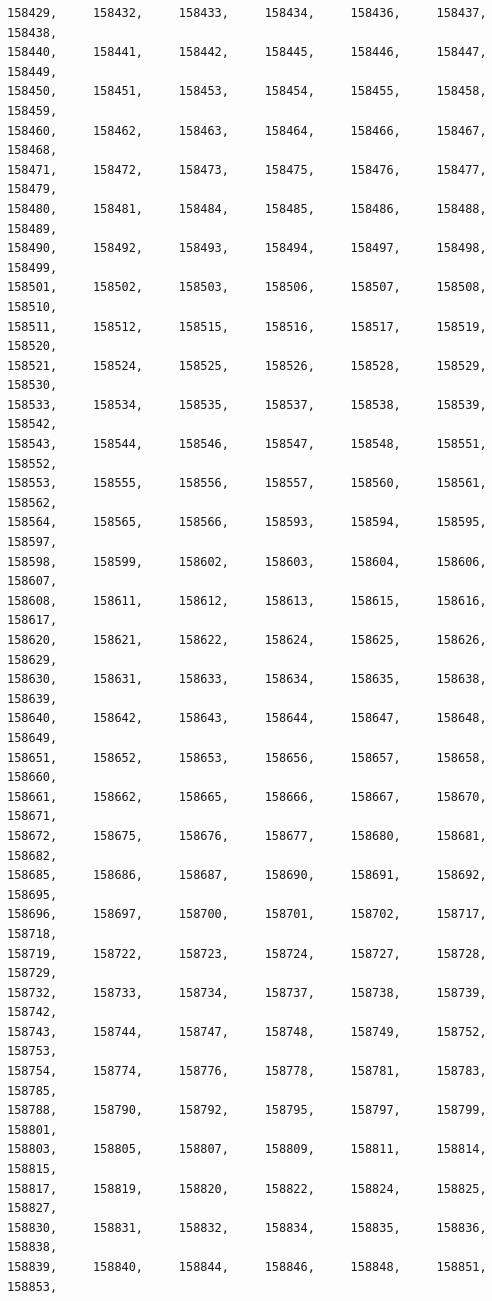 \documentclass[a4paper,11pt]{report}
\begin{document}
\begin{verbatim}
158429,     158432,     158433,     158434,     158436,     158437,     158438,
158440,     158441,     158442,     158445,     158446,     158447,     158449,
158450,     158451,     158453,     158454,     158455,     158458,     158459,
158460,     158462,     158463,     158464,     158466,     158467,     158468,
158471,     158472,     158473,     158475,     158476,     158477,     158479,
158480,     158481,     158484,     158485,     158486,     158488,     158489,
158490,     158492,     158493,     158494,     158497,     158498,     158499,
158501,     158502,     158503,     158506,     158507,     158508,     158510,
158511,     158512,     158515,     158516,     158517,     158519,     158520,
158521,     158524,     158525,     158526,     158528,     158529,     158530,
158533,     158534,     158535,     158537,     158538,     158539,     158542,
158543,     158544,     158546,     158547,     158548,     158551,     158552,
158553,     158555,     158556,     158557,     158560,     158561,     158562,
158564,     158565,     158566,     158593,     158594,     158595,     158597,
158598,     158599,     158602,     158603,     158604,     158606,     158607,
158608,     158611,     158612,     158613,     158615,     158616,     158617,
158620,     158621,     158622,     158624,     158625,     158626,     158629,
158630,     158631,     158633,     158634,     158635,     158638,     158639,
158640,     158642,     158643,     158644,     158647,     158648,     158649,
158651,     158652,     158653,     158656,     158657,     158658,     158660,
158661,     158662,     158665,     158666,     158667,     158670,     158671,
158672,     158675,     158676,     158677,     158680,     158681,     158682,
158685,     158686,     158687,     158690,     158691,     158692,     158695,
158696,     158697,     158700,     158701,     158702,     158717,     158718,
158719,     158722,     158723,     158724,     158727,     158728,     158729,
158732,     158733,     158734,     158737,     158738,     158739,     158742,
158743,     158744,     158747,     158748,     158749,     158752,     158753,
158754,     158774,     158776,     158778,     158781,     158783,     158785,
158788,     158790,     158792,     158795,     158797,     158799,     158801,
158803,     158805,     158807,     158809,     158811,     158814,     158815,
158817,     158819,     158820,     158822,     158824,     158825,     158827,
158830,     158831,     158832,     158834,     158835,     158836,     158838,
158839,     158840,     158844,     158846,     158848,     158851,     158853,

\end{verbatim}
\end{document}

